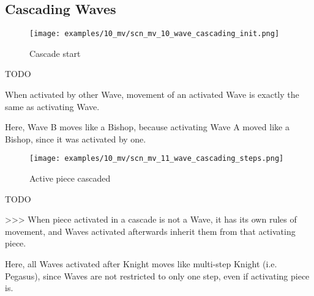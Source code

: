 \clearpage %

\subsection*{Cascading Waves}

\vspace*{-1.4\baselineskip}
\noindent
\begin{figure}[h]
\texttt{[image: examples/10\_mv/scn\_mv\_10\_wave\_cascading\_init.png]}
\caption{Cascade start}
\label{fig:scn_mv_10_wave_cascading_init}
\end{figure}

\huge
TODO
\normalsize

When activated by other Wave, movement of an activated Wave is exactly the same as
activating Wave.

Here, Wave B moves like a Bishop, because activating Wave A moved like a Bishop,
since it was activated by one.

\clearpage %

\vspace*{-2.1\baselineskip}
\noindent
\begin{figure}[h]
\texttt{[image: examples/10\_mv/scn\_mv\_11\_wave\_cascading\_steps.png]}
\caption{Active piece cascaded}
\label{fig:scn_mv_11_wave_cascading_steps}
\end{figure}

\huge
TODO
\normalsize

\textgreater \textgreater \textgreater
When piece activated in a cascade is not a Wave, it has its own rules of movement, and
Waves activated afterwards inherit them from that activating piece.

Here, all Waves activated after Knight moves like multi-step Knight (i.e. Pegasus),
since Waves are not restricted to only one step, even if activating piece is.

\clearpage %

